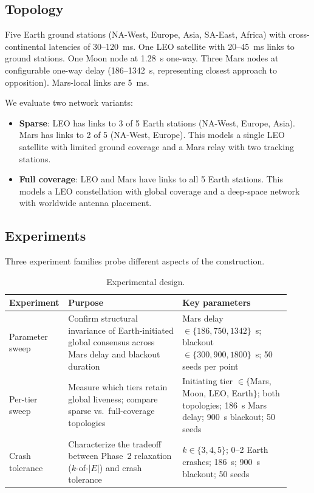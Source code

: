 \documentclass[11pt]{article}
\begin{document}
\subsection{Topology}

Five Earth ground stations (NA-West, Europe, Asia, SA-East, Africa) with cross-continental latencies of 30--120~ms. One LEO satellite with 20--45~ms links to ground stations. One Moon node at 1.28~s one-way. Three Mars nodes at configurable one-way delay (186--1342~s, representing closest approach to opposition). Mars-local links are 5~ms.

We evaluate two network variants:
\begin{itemize}
\item \textbf{Sparse}: LEO has links to 3 of 5 Earth stations (NA-West, Europe, Asia). Mars has links to 2 of 5 (NA-West, Europe). This models a single LEO satellite with limited ground coverage and a Mars relay with two tracking stations.
\item \textbf{Full coverage}: LEO and Mars have links to all 5 Earth stations. This models a LEO constellation with global coverage and a deep-space network with worldwide antenna placement.
\end{itemize}

\subsection{Experiments}

Three experiment families probe different aspects of the construction.

\begin{table}[t]
\centering
\small
\caption{Experimental design.}
\label{tab:design}
\begin{tabular}{p{0.14\linewidth}p{0.40\linewidth}p{0.38\linewidth}}
\toprule
Experiment & Purpose & Key parameters \\
\midrule
Parameter sweep & Confirm structural invariance of Earth-initiated global consensus across Mars delay and blackout duration & Mars delay $\in \{186, 750, 1342\}$~s; blackout $\in \{300, 900, 1800\}$~s; 50 seeds per point \\
Per-tier sweep & Measure which tiers retain global liveness; compare sparse vs.\ full-coverage topologies & Initiating tier $\in \{$Mars, Moon, LEO, Earth$\}$; both topologies; 186~s Mars delay; 900~s blackout; 50 seeds \\
Crash tolerance & Characterize the tradeoff between Phase~2 relaxation ($k$-of-$|E|$) and crash tolerance & $k \in \{3, 4, 5\}$; 0--2 Earth crashes; 186~s; 900~s blackout; 50 seeds \\
\bottomrule
\end{tabular}
\end{table}
\end{document}
